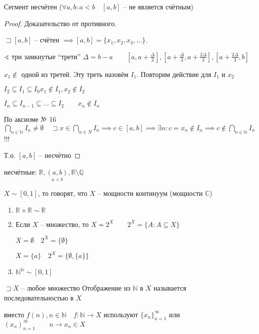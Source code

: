 \documentclass{book}
\newcommand\N{\ensuremath{\mathbb{N}}}
\newcommand\R{\ensuremath{\mathbb{R}}}
\renewcommand\O{\ensuremath{\emptyset}}
\newcommand\Q{\ensuremath{\mathbb{Q}}}
\renewcommand\C{\ensuremath{\mathbb{C}}}
\theoremstyle{definition}
\begin{document}
    \begin{theorem}
        Сегмент несчётен ($\forall a, b:a<b\quad [a,b]$ -- не является счётным)
    \end{theorem}
    \begin{proof}
        Доказательство от противного. 

        $\sqsupset [a,b]$ -- счётен $\implies [a,b] = \{x_1, x_2, x_3, \ldots\}$.

        $\sphericalangle$ три замкнутые ``трети'' $\Delta = b-a\qquad [a,a+\frac{\Delta}{3}], [a + \frac{\Delta}{3}, a + \frac{2\Delta}{3}], [a + \frac{2\Delta}{3}, b] $

        $x_1 \not\in $ одной из третей. 
        Эту треть назовём $I_1$. 
        Повторим действие для $I_1$ и $x_2$

        $I_2\subseteq I_1 \subseteq I_0 x_1\not\in I_1, x_2\not\in I_2$

        $I_n\subseteq I_{n-1}\subseteq  \ldots \subseteq  I_2\qquad x_{n} \not\in I_n $

        По аксиоме № 16 $\bigcap\limits_{n\in \N } I_n \neq \O \quad \sqsupset x\in \bigcap\limits_{n\in N} I_n \implies c\in [a,b] \implies \exists n: c = x_n\not\in I_n \implies c\not\in \bigcap\limits_{n\in \N } I_n$ !!!

        Т.о. $[a,b]$ -- несчётно
    \end{proof}
    \begin{corollary}
        несчётные: $\R, \underset{a<b}{(a,b)}, \R\setminus \Q$

        $X\sim [0,1]$, то говорят, что $X$ -- мощности континуум (мощности $\C$)
    \end{corollary}
    \begin{problem}
        \begin{enumerate}
            \item $\R\times\R\sim \R$
            \item Если $X$ -- множество, то $X\not\sim 2^X\qquad 2^X= \{A:A\subseteq X\}$

            $X = \O \quad 2^X = \{\O \}$

            $X = \{a\}\quad 2^X = \{\O , \{a\}\}$
            \item $\N ^{\N }\sim [0,1]$
         \end{enumerate}
    \end{problem}

    \begin{definition}
        $\sqsupset X$ -- любое множество
        Отображение из $\N $ в $X$ называется последовательностью в $X$

        вместо $f(n), n\in \N \quad f:\N \to X$ используют $\{x_n\}_{n=1}^{\infty }$ или $\left( x_n \right) _{n=1}^{\infty }\qquad n\to x_n\in X$
    \end{definition}
\end{document}
